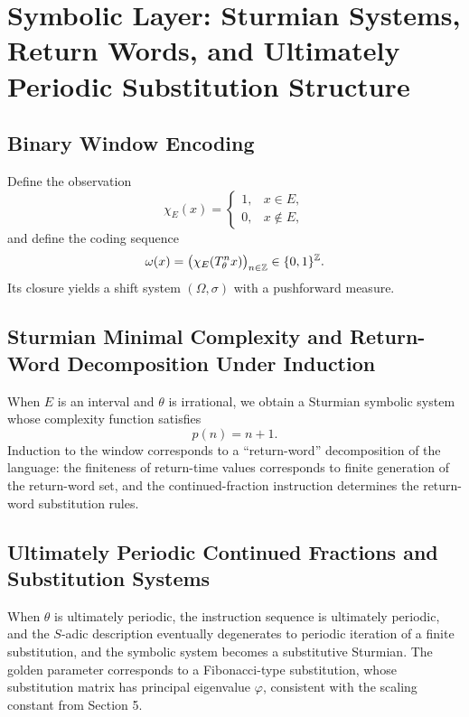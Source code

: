 \section{Symbolic Layer: Sturmian Systems, Return Words, and Ultimately Periodic Substitution Structure}

\subsection{Binary Window Encoding}

Define the observation
\[
\chi_E(x)=
\begin{cases}
1,&x\in E,\\
0,&x\notin E,
\end{cases}
\]
and define the coding sequence
\[
\omega(x)=\bigl(\chi_E(T_\theta^n x)\bigr)_{n\in\mathbb{Z}}\in\{0,1\}^{\mathbb{Z}}.
\]
Its closure yields a shift system $(\Omega,\sigma)$ with a pushforward measure.

\subsection{Sturmian Minimal Complexity and Return-Word Decomposition Under Induction}

When $E$ is an interval and $\theta$ is irrational, we obtain a Sturmian symbolic system whose complexity function satisfies
\[
p(n)=n+1.
\]
Induction to the window corresponds to a ``return-word'' decomposition of the language: the finiteness of return-time values corresponds to finite generation of the return-word set, and the continued-fraction instruction determines the return-word substitution rules.

\subsection{Ultimately Periodic Continued Fractions and Substitution Systems}

When $\theta$ is ultimately periodic, the instruction sequence is ultimately periodic, and the $S$-adic description eventually degenerates to periodic iteration of a finite substitution, and the symbolic system becomes a substitutive Sturmian. The golden parameter corresponds to a Fibonacci-type substitution, whose substitution matrix has principal eigenvalue $\varphi$, consistent with the scaling constant from Section 5.
